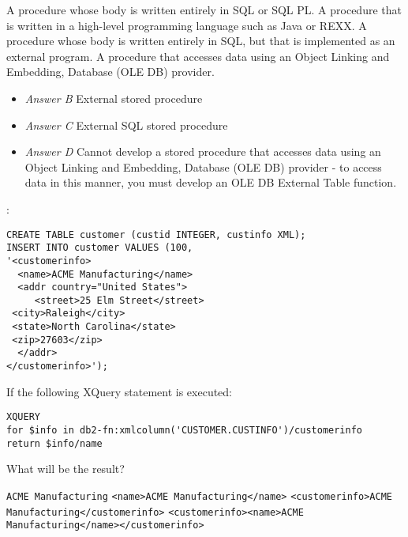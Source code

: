\documentclass[answers, 11pt]{exam}
\begin{document}
\begin{questions}
\begin{choices}
\CorrectChoice A procedure whose body is written entirely in SQL or SQL PL.
\choice A procedure that is written in a high-level programming language such as Java or REXX.
\choice A procedure whose body is written entirely in SQL, but that is implemented as an external program.
\choice	A procedure that accesses data using an Object Linking and Embedding, Database (OLE DB) provider.
\end{choices}

\begin{solution}
\begin{itemize}
\item \textit{Answer B} External stored procedure
\item \textit{Answer C} External SQL stored procedure
\item \textit{Answer D} Cannot develop a stored procedure that accesses data using an Object Linking and 
Embedding, Database (OLE DB) provider - to access data in this manner, you must develop an OLE DB External
Table function.
\end{itemize}
\end{solution}

:
\begin{verbatim}
CREATE TABLE customer (custid INTEGER, custinfo XML);
INSERT INTO customer VALUES (100,
'<customerinfo>
  <name>ACME Manufacturing</name>
  <addr country="United States">
     <street>25 Elm Street</street>
 <city>Raleigh</city>
 <state>North Carolina</state>
 <zip>27603</zip>
  </addr>
</customerinfo>');
\end{verbatim}
If the following XQuery statement is executed:
\begin{verbatim}
XQUERY
for $info in db2-fn:xmlcolumn('CUSTOMER.CUSTINFO')/customerinfo
return $info/name
\end{verbatim}
What will be the result?
\begin{choices}
\choice \texttt{ACME Manufacturing}
\CorrectChoice \texttt{<name>ACME Manufacturing</name>}
\choice \texttt{<customerinfo>ACME Manufacturing</customerinfo>}
\choice \texttt{<customerinfo><name>ACME Manufacturing</name></customerinfo>}
\end{choices}


\end{questions}
\end{document}

